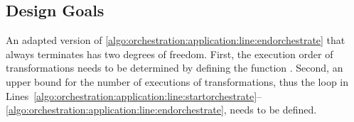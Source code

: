 



\subsection{Design Goals}
\label{chap:orchestration:algorithm:goals}

An adapted version of \autoref{algo:orchestration:application:line:endorchestrate} that always terminates has two degrees of freedom.
First, the execution order of transformations needs to be determined by defining the function .
Second, an upper bound for the number of executions of transformations, thus the loop in Lines~\ref{algo:orchestration:application:line:startorchestrate}--\ref{algo:orchestration:application:line:endorchestrate}, needs to be defined.

